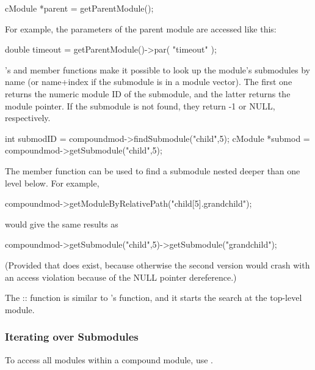 \begin{cpp}
cModule *parent = getParentModule();
\end{cpp}

For example, the parameters of the parent module are accessed
like this:

\begin{cpp}
double timeout = getParentModule()->par( "timeout" );
\end{cpp}


's  and 
member functions make it possible to look up the module's submodules
by name (or name+index if the submodule
is in a module vector). The first one returns the numeric module ID of
the submodule, and the latter returns the module pointer.  If the
submodule is not found, they return -1 or NULL, respectively.

\begin{cpp}
int submodID = compoundmod->findSubmodule("child",5);
cModule *submod = compoundmod->getSubmodule("child",5);
\end{cpp}


The  member function can be used to find
a submodule nested deeper than one level below. For example,

\begin{cpp}
compoundmod->getModuleByRelativePath("child[5].grandchild");
\end{cpp}

would give the same results as

\begin{cpp}
compoundmod->getSubmodule("child",5)->getSubmodule("grandchild");
\end{cpp}

(Provided that  does exist, because otherwise the second
version would crash with an access violation because of the NULL
pointer dereference.)


The :: function is similar
to 's  function, and it
starts the search at the top-level module.


\subsubsection{Iterating over Submodules}


To access all modules within a compound module,
use .

